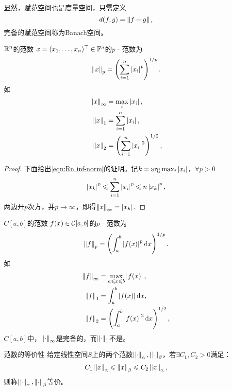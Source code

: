 显然，赋范空间也是度量空间，只需定义
\[
    d(f,g)=\left\lVert f-g\right\rVert,
\]
完备的赋范空间称为Banach空间。

\begin{example}
    {$\mathbb R^n$的范数}{}
    $x=(x_1,\ldots,x_n)^\top\in\mathbb F^n$的$p$ - 范数为
    \[
        \left\lVert x\right\rVert_p=\left(\sum_{i=1}^n\left\lvert x_i\right\rvert^p\right)^{1/p}.
    \]
    如
    \begin{subequations}
        \begin{align}
            \label{eqn:Rn inf-norm}
            \left\lVert x\right\rVert_\infty&=\max_{i}\left\lvert x_i\right\rvert,\\
            \label{eqn:Rn 1-norm}
            \left\lVert x\right\rVert_1&=\sum_{i=1}^n\left\lvert x_i\right\rvert,\\
            \label{eqn:Rn 2-norm}
            \left\lVert x\right\rVert_2&=\left(\sum_{i=1}^n\left\lvert x_i\right\rvert^2\right)^{1/2},
        \end{align}
    \end{subequations}
    \begin{proof}
        下面给出\eqref{eqn:Rn inf-norm}的证明。记$k=\arg\max_i\left\lvert x_i\right\rvert$，$\forall p>0$
        \[
            \left\lvert x_k\right\rvert^p\leqslant\sum_{i=1}^n\left\lvert x_i\right\rvert^p\leqslant n\left\lvert x_k\right\rvert^p,
        \]
        两边开$p$次方，并$p\to\infty$，即得$\left\lVert x\right\rVert_\infty=\left\lvert x_k\right\rvert.$
    \end{proof}
\end{example}

\begin{example}
    {$C[a,b]$的范数}{}
    $f(x)\in\mathcal C[a,b]$的$p$ - 范数为
    \[
        \left\lVert f\right\rVert_p=\left(\int_a^b\left\lvert f(x)\right\rvert^p\mathop{}\!\mathrm{d} x\right)^{1/p}.
    \]
    如
    \begin{subequations}
        \begin{align}
            \left\lVert f\right\rVert_\infty&=\max_{a\leqslant x\leqslant b}\left\lvert f(x)\right\rvert,\\
            \left\lVert f\right\rVert_1&=\int_a^b\left\lvert f(x)\right\rvert\mathop{}\!\mathrm{d} x,\\
            \left\lVert f\right\rVert_2&=\left(\int_a^b\left\lvert f(x)\right\rvert^2\mathop{}\!\mathrm{d} x\right)^{1/2},
        \end{align}
    \end{subequations}
    $C[a,b]$中，$\left\lVert\cdot\right\rVert_\infty$是完备的，而$\left\lVert\cdot\right\rVert_1$不是。
\end{example}

\begin{definition}
    {范数的等价性}{}
    给定线性空间$S$上的两个范数$\left\lVert\cdot\right\rVert_\alpha,\left\lVert\cdot\right\rVert_\beta$，若$\exists C_1,C_2>0$满足：
    \[
        C_1\left\lVert x\right\rVert_\alpha\leqslant\left\lVert x\right\rVert_\beta\leqslant C_2\left\lVert x\right\rVert_\alpha,
    \]
    则称$\left\lVert\cdot\right\rVert_\alpha,\left\lVert\cdot\right\rVert_\beta$等价。
\end{definition}

